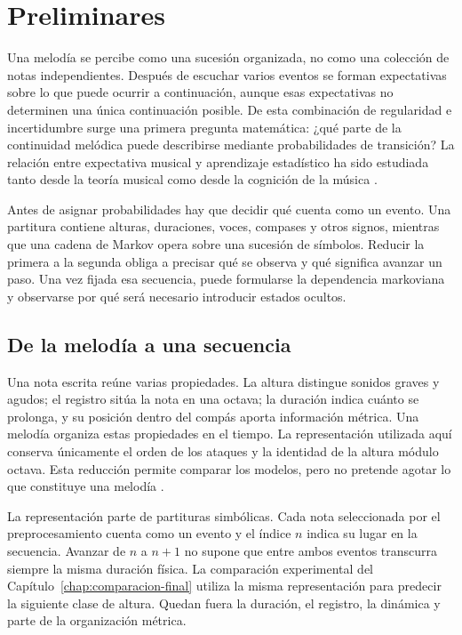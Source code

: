 \chapter{Preliminares}
\label{chap:introduction}

Una melodía se percibe como una sucesión organizada, no como una colección de notas independientes. Después de escuchar varios eventos se forman expectativas sobre lo que puede ocurrir a continuación, aunque esas expectativas no determinen una única continuación posible. De esta combinación de regularidad e incertidumbre surge una primera pregunta matemática: ¿qué parte de la continuidad melódica puede describirse mediante probabilidades de transición? La relación entre expectativa musical y aprendizaje estadístico ha sido estudiada tanto desde la teoría musical como desde la cognición de la música \cite{temperley2007,pearce2012}.

Antes de asignar probabilidades hay que decidir qué cuenta como un evento. Una partitura contiene alturas, duraciones, voces, compases y otros signos, mientras que una cadena de Markov opera sobre una sucesión de símbolos. Reducir la primera a la segunda obliga a precisar qué se observa y qué significa avanzar un paso. Una vez fijada esa secuencia, puede formularse la dependencia markoviana y observarse por qué será necesario introducir estados ocultos.

\section{De la melodía a una secuencia}

Una nota escrita reúne varias propiedades. La altura distingue sonidos graves y agudos; el registro sitúa la nota en una octava; la duración indica cuánto se prolonga, y su posición dentro del compás aporta información métrica. Una melodía organiza estas propiedades en el tiempo. La representación utilizada aquí conserva únicamente el orden de los ataques y la identidad de la altura módulo octava. Esta reducción permite comparar los modelos, pero no pretende agotar lo que constituye una melodía \cite{temperley2007,pearce2012}.

La representación parte de partituras simbólicas. Cada nota seleccionada por el preprocesamiento cuenta como un evento y el índice $n$ indica su lugar en la secuencia. Avanzar de $n$ a $n+1$ no supone que entre ambos eventos transcurra siempre la misma duración física. La comparación experimental del Capítulo~\ref{chap:comparacion-final} utiliza la misma representación para predecir la siguiente clase de altura. Quedan fuera la duración, el registro, la dinámica y parte de la organización métrica.

